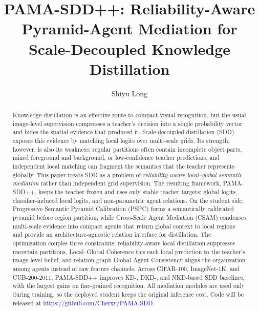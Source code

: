 \documentclass[a4paper,fleqn]{cas-dc}
\begin{document}
\let\WriteBookmarks\relax
\renewcommand\floatpagefraction{.85}
\renewcommand\dblfloatpagefraction{.85}
\renewcommand\textfraction{.05}


\title[mode=title]{PAMA-SDD++: Reliability-Aware Pyramid-Agent Mediation for Scale-Decoupled Knowledge Distillation}

\author[1]{Shiyu Long}
\cormark[1]



\begin{abstract}
Knowledge distillation is an effective route to compact visual recognition,
but the usual image-level supervision compresses a teacher's decision into a
single probability vector and hides the spatial evidence that produced it.
Scale-decoupled distillation (SDD) exposes this evidence by matching local
logits over multi-scale grids. Its strength, however, is also its weakness:
regular partitions often contain incomplete object parts, mixed foreground and
background, or low-confidence teacher predictions, and independent local
matching can fragment the semantics that the teacher represents globally. This
paper treats SDD as a problem of \emph{reliability-aware local--global semantic
mediation} rather than independent grid supervision. The resulting framework,
PAMA-SDD++, keeps the teacher frozen and uses only stable teacher targets:
global logits, classifier-induced local logits, and non-parametric agent
relations. On the student side, Progressive Semantic Pyramid Calibration
(PSPC) forms a semantically calibrated pyramid before region partition, while
Cross-Scale Agent Mediation (CSAM) condenses multi-scale evidence into compact
agents that return global context to local regions and provide an
architecture-agnostic relation interface for distillation. The optimization
couples three constraints: reliability-aware local distillation suppresses
uncertain partitions, Local--Global Coherence ties each local prediction to
the teacher's image-level belief, and relation-graph Global Agent Consistency
aligns the organization among agents instead of raw feature channels. Across
CIFAR-100, ImageNet-1K, and CUB-200-2011, PAMA-SDD++ improves KD-, DKD-, and
NKD-based SDD baselines, with the largest gains on fine-grained recognition.
All mediation modules are used only during training, so the deployed student
keeps the original inference cost. Code will be released at
\textcolor{blue}{https://github.com/Cherxy/PAMA-SDD}.
\end{abstract}
\end{document}
